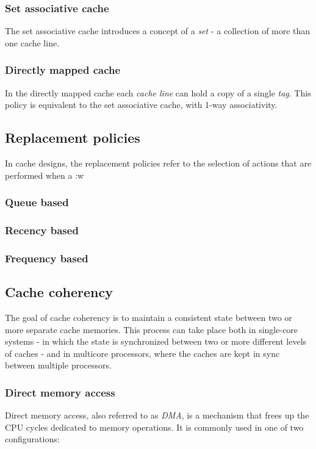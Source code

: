 \subsubsection{Set associative cache}
The set associative cache introduces a concept of a \textit{set} - a collection
of more than one cache line.

\subsubsection{Directly mapped cache}
In the directly mapped cache each \textit{cache line} can hold a copy of
a single \textit{tag}. This policy is equivalent to the set associative cache, with
1-way associativity.

%
\subsection{Replacement policies}
In cache designs, the replacement policies refer to the selection of actions that are performed when a :w

\subsubsection{Queue based}
\subsubsection{Recency based}
\subsubsection{Frequency based}
%
\subsection{Cache coherency}

The goal of cache coherency is to maintain a consistent state between two or
more separate cache memories. This process can take place both in single-core
systems - in which the state is synchronized between two or more different levels of caches
- and in multicore processors, where the caches are kept in sync between multiple
processors.

\pagebreak
\subsubsection{Direct memory access} \label{sec:dma}
Direct memory access, also referred to as \textit{DMA}, is a mechanism that
frees up the CPU cycles dedicated to memory operations. It is commonly used 
in one of two configurations:

